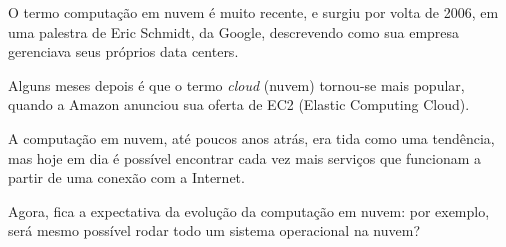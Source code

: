 O termo computação em nuvem é muito recente, e surgiu por volta de 2006, em uma
palestra de Eric Schmidt, da Google, descrevendo como sua empresa gerenciava seus
próprios data centers. 

Alguns meses depois é que o termo \emph{cloud} (nuvem) tornou-se mais popular, quando
a Amazon anunciou sua oferta de EC2 (Elastic Computing Cloud).

A computação em nuvem, até poucos anos atrás, era tida como uma tendência, mas hoje
em dia é possível encontrar cada vez mais serviços que funcionam a partir de uma
conexão com a Internet.

Agora, fica a expectativa da evolução da computação em nuvem: por exemplo, será
mesmo possível rodar todo um sistema operacional na nuvem? 
